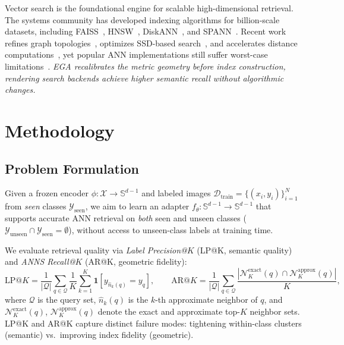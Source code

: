 \documentclass{article}
\begin{document}
Vector search is the foundational engine for scalable high-dimensional retrieval.
The systems community has developed indexing algorithms for billion-scale datasets, including FAISS~\cite{johnson2019billion}, HNSW~\cite{malkov2018efficient}, DiskANN~\cite{subramanya2019diskann}, and SPANN~\cite{chen2021spann}.
Recent work refines graph topologies~\cite{NEURIPS2024_bab1486c, NEURIPS2024_6dc63b40}, optimizes SSD-based search~\cite{osdi25pipeann, fast26odinann}, and accelerates distance computations~\cite{jaasaari2024lorann}, yet popular ANN implementations still suffer worst-case limitations~\cite{NEURIPS2023_d0ac28b7}.
\emph{EGA recalibrates the
	metric geometry before index construction, rendering search
	backends achieve higher semantic recall without algorithmic changes.}

\section{Methodology}
\label{sec:method}

\subsection{Problem Formulation}
\label{sec:formulation}

Given a frozen encoder $\phi : \mathcal{X} \to \mathbb{S}^{d-1}$ and labeled images $\mathcal{D}_\text{train} = \{(x_i, y_i)\}_{i=1}^{N}$ from \emph{seen} classes $\mathcal{Y}_\text{seen}$, we aim to learn an adapter $f_\theta : \mathbb{S}^{d-1} \to \mathbb{S}^{d-1}$ that supports accurate ANN retrieval on \emph{both} seen and unseen classes ($\mathcal{Y}_\text{unseen} \cap \mathcal{Y}_\text{seen} = \emptyset$), without access to unseen-class labels at training time.

We evaluate retrieval quality via \emph{Label Precision@$K$} (LP@K, semantic quality) and \emph{ANNS Recall@$K$} (AR@K, geometric fidelity):
\begin{equation}
    \text{LP}@K = \frac{1}{|\mathcal{Q}|} \sum_{q \in \mathcal{Q}}
    \frac{1}{K} \sum_{k=1}^{K}
    \mathbf{1}\!\left[y_{\hat{n}_k(q)} = y_q\right],
    \qquad
    \text{AR}@K = \frac{1}{|\mathcal{Q}|} \sum_{q \in \mathcal{Q}}
    \frac{\left|\mathcal{N}_K^\text{exact}(q) \cap \mathcal{N}_K^\text{approx}(q)\right|}{K},
    \label{eq:lp_ar}
\end{equation}
where $\mathcal{Q}$ is the query set, $\hat{n}_k(q)$ is the $k$-th approximate neighbor of $q$, and $\mathcal{N}_K^\text{exact}(q)$, $\mathcal{N}_K^\text{approx}(q)$ denote the exact and approximate top-$K$ neighbor sets. LP@K and AR@K capture distinct failure modes: tightening within-class clusters (semantic) vs.\ improving index fidelity (geometric).
\end{document}
